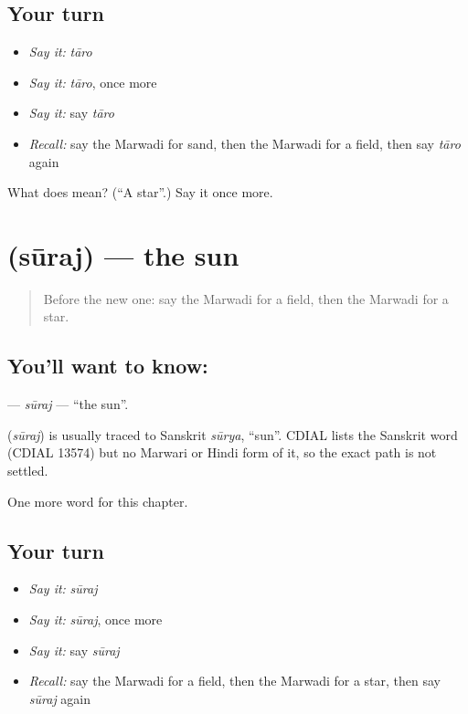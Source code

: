 \subsection*{Your turn}
\begin{itemize}
\raggedright
  \item \emph{Say it:} \emph{tāro}
  \item \emph{Say it:} \emph{tāro}, once more
  \item \emph{Say it:} say \emph{tāro}
  \item \emph{Recall:} say the Marwadi for sand, then the Marwadi for a field, then say \emph{tāro} again
\end{itemize}

\begin{tcolorbox}[breakable,colback=teal!4,colframe=teal!35!black,title={Before you move on}]
What does  mean? (\textquotedblleft{}A star\textquotedblright{}.) Say it once more.
\end{tcolorbox}
\section[\texorpdfstring{\mw{सूरज} (sūraj)}{सूरज (sūraj)}]{ (sūraj) — the sun}

\label{lesson:MW-C69-suraj}



\begin{quote}
Before the new one: say the Marwadi for a field, then the Marwadi for a star.
\end{quote}

\subsection*{You'll want to know: }
\textbf{} — \emph{sūraj} — \textquotedblleft{}the sun\textquotedblright{}.

\begin{cousinweb}
\textbf{} (\emph{sūraj}) is usually traced to Sanskrit \emph{sūrya}, \textquotedblleft{}sun\textquotedblright{}. CDIAL lists the Sanskrit word (CDIAL 13574) but no Marwari or Hindi form of it, so the exact path is not settled.
\end{cousinweb}

\begin{grammarlens}[title={What you've built}]
One more word for this chapter.
\end{grammarlens}

\subsection*{Your turn}
\begin{itemize}
\raggedright
  \item \emph{Say it:} \emph{sūraj}
  \item \emph{Say it:} \emph{sūraj}, once more
  \item \emph{Say it:} say \emph{sūraj}
  \item \emph{Recall:} say the Marwadi for a field, then the Marwadi for a star, then say \emph{sūraj} again
\end{itemize}

